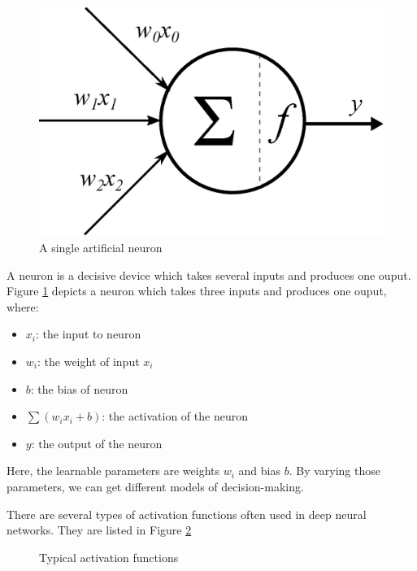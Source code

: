 \begin{figure}
	\vspace{-20pt} %
	\centering
	\includegraphics[scale=0.35]{Chapters/Fig/neuron.eps}
	\caption{A single artificial neuron}
	\label{fig:neuron}
	\vspace{-25pt} %
\end{figure}

A neuron is a decisive device which takes several inputs and produces one ouput. Figure \ref{fig:neuron} depicts a neuron which takes three inputs and produces one ouput, where:
\begin{itemize}[noitemsep]
	\item $x_i$: the input to neuron
	\item $w_i$: the weight of input $x_i$
	\item $b$: the bias of neuron
	\item $\sum\left(w_ix_i + b\right)$: the activation of the neuron
	\item $y$: the output of the neuron
\end{itemize}

Here, the learnable parameters are weights $w_i$ and bias $b$. By varying those parameters, we can get different models of decision-making.

There are several types of activation functions often used in deep neural networks. They are listed in Figure \ref{fig:activation-function}
\begin{figure}[h]
	\centering
	\qquad
	\qquad
	\caption{Typical activation functions}
	\label{fig:activation-function}
\end{figure}

